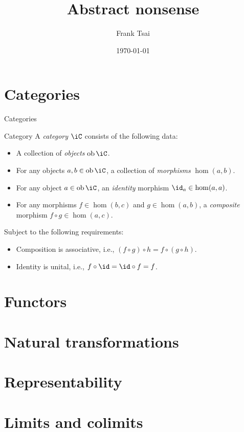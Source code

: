 \documentclass{beamer}
\title{Abstract nonsense}
\author[Frank T]{Frank Tsai\inst{1}}
\institute{\inst{1} (SUNY at Buffalo)}
\date{\today}
\begin{document}
\begin{frame}
  \maketitle
\end{frame}

\section{Categories}
\label{sec:categories}

\begin{frame}{Categories}
  \begin{block}{Category}
    A \emph{category} $\iC$ consists of the following data:
    \begin{itemize}
    \item A collection of \emph{objects} $\ob\iC$.
    \item For any objects $a, b \in \ob\iC$, a collection of \emph{morphisms} $\hom(a,b)$.
    \item For any object $a \in \ob\iC$, an \emph{identity} morphism $\id_{a} \in \hom(a,a)$.
    \item For any morphisms $f \in \hom(b,c)$ and $g \in \hom(a,b)$, a \emph{composite} morphism $f \circ g \in \hom(a,c)$.
    \end{itemize}
    Subject to the following requirements:
    \begin{itemize}
    \item Composition is associative, i.e., $(f \circ g) \circ h = f \circ (g \circ h)$.
    \item Identity is unital, i.e., $f \circ \id = \id \circ f = f$.
    \end{itemize}
  \end{block}
\end{frame}

\section{Functors}
\label{sec:functors}

\section{Natural transformations}
\label{sec:natural-transformations}

\section{Representability}
\label{sec:representability}

\section{Limits and colimits}
\label{sec:limits-and-colimits}
\end{document}
